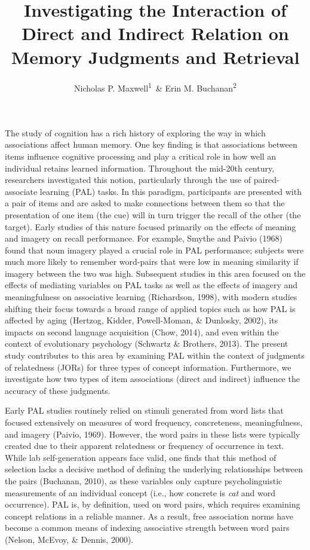 \documentclass[english,,man]{apa6}
\title{Investigating the Interaction of Direct and Indirect Relation on Memory Judgments and Retrieval}
\author{Nicholas P. Maxwell\textsuperscript{1}~\& Erin M. Buchanan\textsuperscript{2}}
\date{}
\affiliation{
\vspace{0.5cm}
\textsuperscript{1} University of Southern Mississippi\\\textsuperscript{2} Harrisburg University of Science and Technology}
\begin{document}
\maketitle

The study of cognition has a rich history of exploring the way in which associations affect human memory. One key finding is that associations between items influence cognitive processing and play a critical role in how well an individual retains learned information. Throughout the mid-20th century, researchers investigated this notion, particularly through the use of paired-associate learning (PAL) tasks. In this paradigm, participants are presented with a pair of items and are asked to make connections between them so that the presentation of one item (the cue) will in turn trigger the recall of the other (the target). Early studies of this nature focused primarily on the effects of meaning and imagery on recall performance. For example, Smythe and Paivio (1968) found that noun imagery played a crucial role in PAL performance; subjects were much more likely to remember word-pairs that were low in meaning similarity if imagery between the two was high. Subsequent studies in this area focused on the effects of mediating variables on PAL tasks as well as the effects of imagery and meaningfulness on associative learning (Richardson, 1998), with modern studies shifting their focus towards a broad range of applied topics such as how PAL is affected by aging (Hertzog, Kidder, Powell-Moman, \& Dunlosky, 2002), its impacts on second language acquisition (Chow, 2014), and even within the context of evolutionary psychology (Schwartz \& Brothers, 2013). The present study contributes to this area by examining PAL within the context of judgments of relatedness (JORs) for three types of concept information. Furthermore, we investigate how two types of item associations (direct and indirect) influence the accuracy of these judgments.

Early PAL studies routinely relied on stimuli generated from word lists that focused extensively on measures of word frequency, concreteness, meaningfulness, and imagery (Paivio, 1969). However, the word pairs in these lists were typically created due to their apparent relatedness or frequency of occurrence in text. While lab self-generation appears face valid, one finds that this method of selection lacks a decisive method of defining the underlying relationships between the pairs (Buchanan, 2010), as these variables only capture psycholinguistic measurements of an individual concept (i.e., how concrete is \emph{cat} and word occurrence). PAL is, by definition, used on word pairs, which requires examining concept relations in a reliable manner. As a result, free association norms have become a common means of indexing associative strength between word pairs (Nelson, McEvoy, \& Dennis, 2000).
\end{document}
